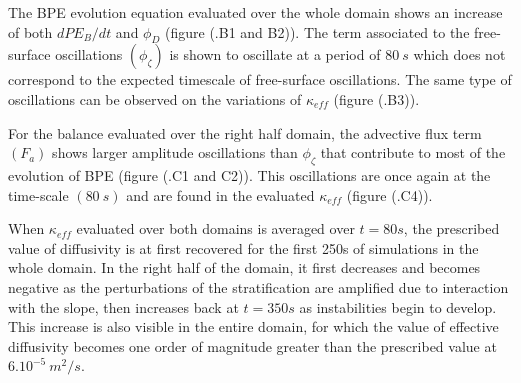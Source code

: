 The BPE evolution equation evaluated over the whole domain shows an increase of both $dPE_B/dt$ and $\phi_D$ (figure (.B1 and B2)). The term associated to the free-surface oscillations $(\phi_{\zeta})$ is shown to oscillate at a period of $80\ s$ which does not correspond to the expected timescale of free-surface oscillations. The same type of oscillations can be observed on the variations of $\kappa_{eff}$ (figure (.B3)). 

For the balance evaluated over the right half domain, the advective flux term $(F_a)$ shows larger amplitude oscillations than $\phi_{\zeta}$ that contribute to most of the evolution of BPE (figure (.C1 and C2)). This oscillations are once again at the time-scale $(80\ s)$ and are found in the evaluated $\kappa_{eff}$ (figure (.C4)).

When $\kappa_{eff}$ evaluated over both domains is averaged over $t=80s$, the prescribed value of diffusivity is at first recovered for the first 250s of simulations in the whole domain. In the right half of the domain, it first decreases and becomes negative as the perturbations of the stratification are amplified due to interaction with the slope, then increases back at $t=350s$ as instabilities begin to develop. This increase is also visible in the entire domain, for which the value of effective diffusivity becomes one order of magnitude greater than the prescribed value at $6.10^{-5} \ m^2/s$. 

